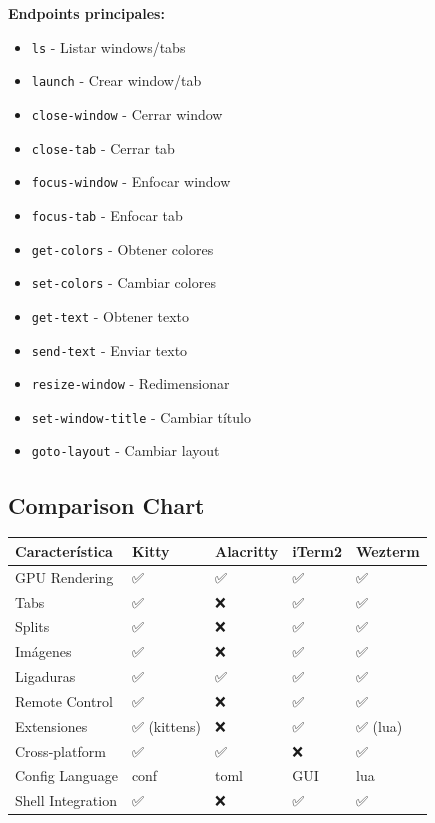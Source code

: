 \documentclass[
  doc,
  floatsintext,
  longtable,
  a4paper,
  nolmodern,
  notxfonts,
  notimes,
  12pt,
  colorlinks=true,linkcolor=blue,citecolor=blue,urlcolor=blue]{apa7}
\providecommand{\tightlist}{%
  \setlength{\itemsep}{0pt}\setlength{\parskip}{0pt}}
\newcounter{none} %
\begin{document}
\textbf{Endpoints principales:}

\begin{itemize}
\tightlist
\item
  \texttt{ls} - Listar windows/tabs
\item
  \texttt{launch} - Crear window/tab
\item
  \texttt{close-window} - Cerrar window
\item
  \texttt{close-tab} - Cerrar tab
\item
  \texttt{focus-window} - Enfocar window
\item
  \texttt{focus-tab} - Enfocar tab
\item
  \texttt{get-colors} - Obtener colores
\item
  \texttt{set-colors} - Cambiar colores
\item
  \texttt{get-text} - Obtener texto
\item
  \texttt{send-text} - Enviar texto
\item
  \texttt{resize-window} - Redimensionar
\item
  \texttt{set-window-title} - Cambiar título
\item
  \texttt{goto-layout} - Cambiar layout
\end{itemize}

\subsection{Comparison Chart}\label{comparison-chart}

{\def\LTcaptype{none} %
\begin{longtable}[]{@{}lllll@{}}
\toprule\noalign{}
Característica & Kitty & Alacritty & iTerm2 & Wezterm \\
\midrule\noalign{}
\endhead
\bottomrule\noalign{}
\endlastfoot
GPU Rendering & ✅ & ✅ & ✅ & ✅ \\
Tabs & ✅ & ❌ & ✅ & ✅ \\
Splits & ✅ & ❌ & ✅ & ✅ \\
Imágenes & ✅ & ❌ & ✅ & ✅ \\
Ligaduras & ✅ & ✅ & ✅ & ✅ \\
Remote Control & ✅ & ❌ & ✅ & ✅ \\
Extensiones & ✅ (kittens) & ❌ & ✅ & ✅ (lua) \\
Cross-platform & ✅ & ✅ & ❌ & ✅ \\
Config Language & conf & toml & GUI & lua \\
Shell Integration & ✅ & ❌ & ✅ & ✅ \\
\end{longtable}
}
\end{document}
